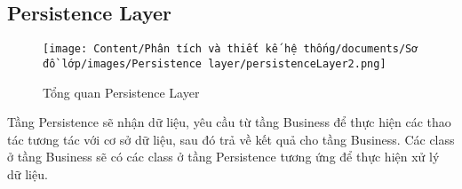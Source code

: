 \subsection{Persistence Layer}

\begin{figure}[H]
    \centering
    \texttt{[image: Content/Phân tích và thiết kế hệ thống/documents/Sơ đồ lớp/images/Persistence layer/persistenceLayer2.png]}
    \vspace{0.5cm}
    \caption{Tổng quan Persistence Layer}
    \label{fig:Tổng quan Persistence Layer}
\end{figure}
Tầng Persistence sẽ nhận dữ liệu, yêu cầu từ tầng Business để thực hiện các thao tác tương tác với cơ sở dữ liệu, sau đó trả về kết quả cho tầng Business.
Các class ở tầng Business sẽ có các class ở tầng Persistence tương ứng để thực hiện xử lý dữ liệu.

